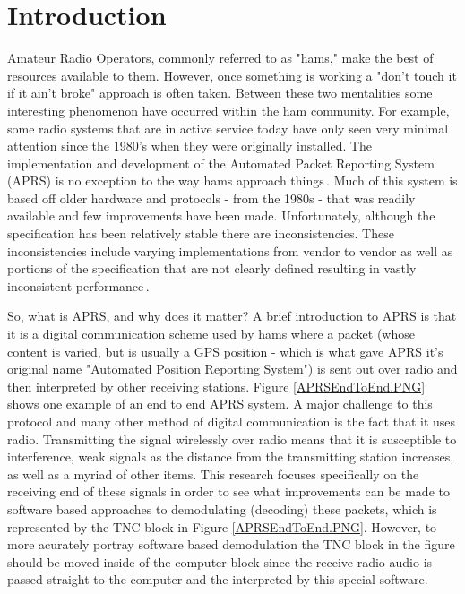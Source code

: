 \chapter{Introduction}

Amateur Radio Operators, commonly referred to as "hams," make the best of resources available to them. However, once something is working a "don't touch it if it ain't broke" approach is often taken. Between these two mentalities some interesting phenomenon have occurred within the ham community. For example, some radio systems that are in active service today have only seen very minimal attention since the 1980's when they were originally installed. The implementation and development of the Automated Packet Reporting System (APRS) is no exception to the way hams approach things\,\cite{Bruninga}. Much of this system is based off older hardware and protocols - from the 1980s - that was readily available and few improvements have been made. Unfortunately, although the specification has been relatively stable there are inconsistencies. These inconsistencies include varying implementations from vendor to vendor as well as portions of the specification that are not clearly defined resulting in vastly inconsistent performance\,\cite{KWFThesis, KWFTAPR}.

So, what is APRS, and why does it matter? A brief introduction to APRS is that it is a digital communication scheme used by hams where a packet (whose content is varied, but is usually a GPS position - which is what gave APRS it's original name "Automated Position Reporting System"\cite{WikiAPRS}) is sent out over radio and then interpreted by other receiving stations. Figure \ref{APRSEndToEnd.PNG} shows one example of an end to end APRS system. A major challenge to this protocol and many other method of digital communication is the fact that it uses radio. Transmitting the signal wirelessly over radio means that it is susceptible to interference, weak signals as the distance from the transmitting station increases, as well as a myriad of other items. This research focuses specifically on the receiving end of these signals in order to see what improvements can be made to software based approaches to demodulating (decoding) these packets, which is represented by the TNC block in Figure \ref{APRSEndToEnd.PNG}. However, to more acurately portray software based demodulation the TNC block in the figure should be moved inside of the computer block since the receive radio audio is passed straight to the computer and the interpreted by this special software.

